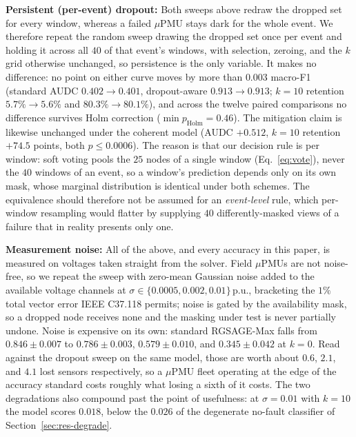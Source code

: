 \documentclass[3p,times,procedia]{elsarticle}
\begin{document}
\textbf{Persistent (per-event) dropout:} Both sweeps above redraw the dropped set for every window, whereas a failed $\mu$PMU stays dark for the whole event. We therefore repeat the random sweep drawing the dropped set once per event and holding it across all $40$ of that event's windows, with selection, zeroing, and the $k$ grid otherwise unchanged, so persistence is the only variable. It makes no difference: no point on either curve moves by more than $0.003$ macro-F1 (standard AUDC $0.402\!\to\!0.401$, dropout-aware $0.913\!\to\!0.913$; $k=10$ retention $5.7\%\!\to\!5.6\%$ and $80.3\%\!\to\!80.1\%$), and across the twelve paired comparisons no difference survives Holm correction ($\min p_{\text{Holm}}=0.46$). The mitigation claim is likewise unchanged under the coherent model (AUDC $+0.512$, $k=10$ retention $+74.5$ points, both $p\le0.0006$). The reason is that our decision rule is per window: soft voting pools the $25$ nodes of a single window (Eq.~\eqref{eq:vote}), never the $40$ windows of an event, so a window's prediction depends only on its own mask, whose marginal distribution is identical under both schemes. The equivalence should therefore not be assumed for an \emph{event-level} rule, which per-window resampling would flatter by supplying $40$ differently-masked views of a failure that in reality presents only one.

\textbf{Measurement noise:} All of the above, and every accuracy in this paper, is measured on voltages taken straight from the solver. Field $\mu$PMUs are not noise-free, so we repeat the sweep with zero-mean Gaussian noise added to the available voltage channels at $\sigma \in \{0.0005, 0.002, 0.01\}$\,p.u., bracketing the $1\%$ total vector error IEEE C37.118 permits; noise is gated by the availability mask, so a dropped node receives none and the masking under test is never partially undone. Noise is expensive on its own: standard RGSAGE-Max falls from $0.846\pm0.007$ to $0.786\pm0.003$, $0.579\pm0.010$, and $0.345\pm0.042$ at $k=0$. Read against the dropout sweep on the same model, those are worth about $0.6$, $2.1$, and $4.1$ lost sensors respectively, so a $\mu$PMU fleet operating at the edge of the accuracy standard costs roughly what losing a sixth of it costs. The two degradations also compound past the point of usefulness: at $\sigma=0.01$ with $k=10$ the model scores $0.018$, below the $0.026$ of the degenerate no-fault classifier of Section~\ref{sec:res-degrade}.
\end{document}
